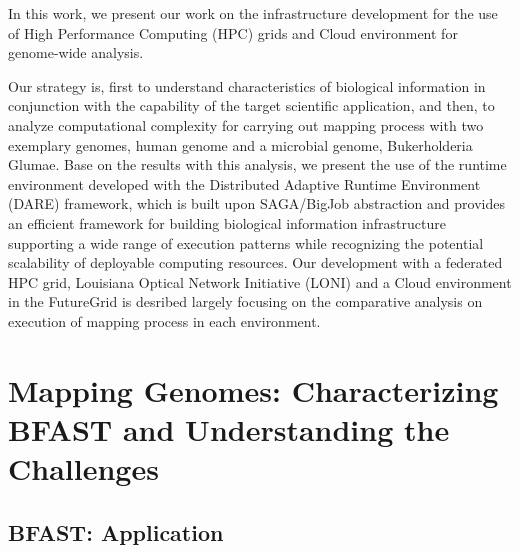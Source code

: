 \documentclass{acm_proc_article-sp}
\begin{document}
 In
this work, we present our work on the infrastructure development for
the use of High Performance Computing (HPC) grids and Cloud
environment for genome-wide analysis.

Our strategy is, first to understand characteristics of biological information in conjunction with the capability of the target scientific application, and then, to analyze computational complexity for carrying out mapping process with two exemplary genomes, human genome and a microbial genome, Bukerholderia Glumae.  Base on the results with this analysis, we present the use of the runtime environment developed with the Distributed Adaptive Runtime Environment (DARE) framework, which is built upon SAGA/BigJob abstraction and provides an efficient framework for building biological information infrastructure supporting a wide range of execution patterns while recognizing the potential scalability of deployable computing resources.  Our development with a federated HPC grid, Louisiana Optical Network Initiative (LONI) and a Cloud environment in the FutureGrid is desribed largely focusing on the comparative analysis on execution of mapping process in each environment. 




\section{Mapping Genomes: Characterizing BFAST and Understanding
  the Challenges}

\subsection{BFAST: Application}
\end{document}
